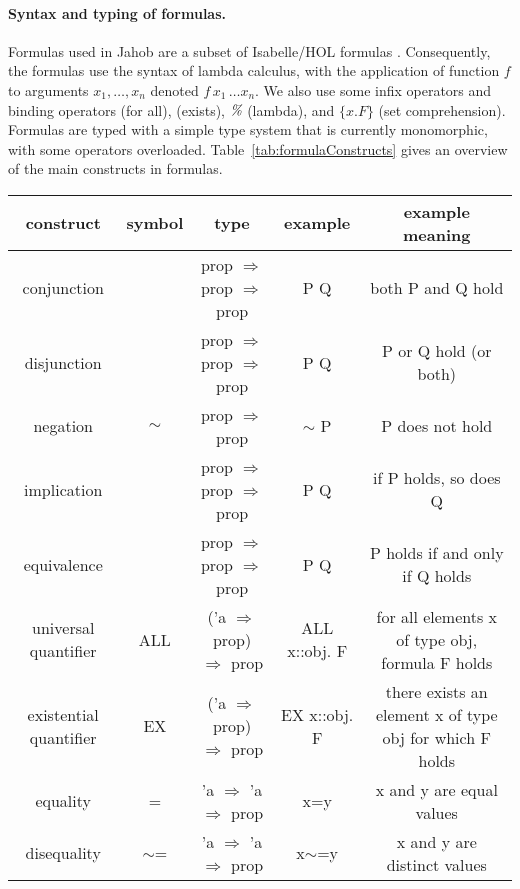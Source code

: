 \paragraph{Syntax and typing of formulas.}
Formulas used in Jahob are a subset of Isabelle/HOL formulas
\cite{NipkowETAL02IsabelleHOL}.  Consequently, the formulas use
the syntax of lambda calculus, with the application of function $f$ to
arguments $x_1,\ldots,x_n$ denoted $f\, x_1\, \ldots x_n$.  We also
use some infix operators and binding operators  (for all),
 (exists), $\textit{\%}$ (lambda), and $\{ x. F \}$ (set
comprehension).  Formulas are typed with a simple type system that is
currently monomorphic, with some operators overloaded.  
Table~\ref{tab:formulaConstructs} gives an overview of the main constructs in formulas.

\begin{table*}
\begin{center}
\begin{tabular}{c|c|c|c|c}
construct & symbol & type & example & example meaning \\ \hline \hline
conjunction & \q{\&} & prop $\Rightarrow$ prop $\Rightarrow$ prop & P \q{\&} Q & both P and Q hold \\
disjunction & \q{|}  & prop $\Rightarrow$ prop $\Rightarrow$ prop & P \q{|} Q & P or Q hold (or both) \\
negation & ${\sim}$ & prop $\Rightarrow$ prop & ${\sim}$ P & P does not hold \\
implication & \q{-->}  & prop $\Rightarrow$ prop $\Rightarrow$ prop & P \q{-->} Q & if P holds, so does Q \\
equivalence & \q{=}  & prop $\Rightarrow$ prop $\Rightarrow$ prop & P \q{=} Q & P holds if and only if Q holds \\ \hline
universal quantifier & ALL & ('a $\Rightarrow$ prop) $\Rightarrow$ prop & ALL x::obj. F & 
        \parbox[c]{1.5in}{for all elements x of type obj, formula F holds} \\
existential quantifier & EX & ('a $\Rightarrow$ prop) $\Rightarrow$ prop & EX x::obj. F & 
        \parbox[c]{1.5in}{there exists an element x of type obj for which F holds} \\ \hline
equality & = & 'a $\Rightarrow$ 'a $\Rightarrow$ prop & x=y & 
        \parbox[c]{1.5in}{x and y are equal values} \\ 
disequality & {${\sim}$=} & 'a $\Rightarrow$ 'a $\Rightarrow$ prop & x{${\sim}$=}y & 
        \parbox[c]{1.5in}{x and y are distinct values} \\ 

\end{tabular}
\end{center}
\end{table*}
